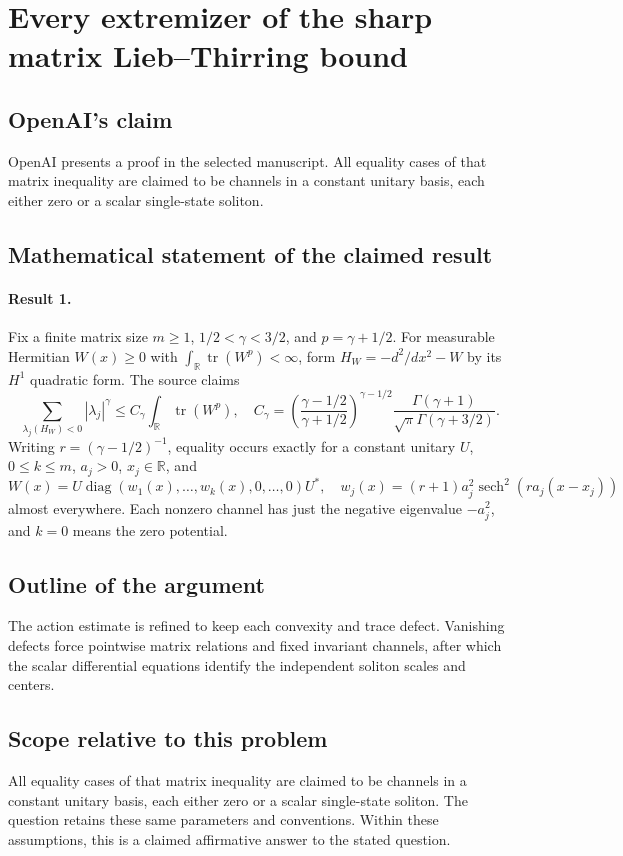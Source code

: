 \documentclass[11pt]{article}
\begin{document}
\section*{Every extremizer of the sharp matrix Lieb–Thirring bound}

\subsection{OpenAI's claim}
OpenAI presents a proof in the selected manuscript. All equality cases of that matrix inequality are claimed to be channels in a constant unitary basis, each either zero or a scalar single-state soliton.

\subsection{Mathematical statement of the claimed result}
\paragraph{Result 1.} Fix a finite matrix size \(m\ge1\), \(1/2<\gamma<3/2\), and \(p=\gamma+1/2\). For measurable Hermitian \(W(x)\ge0\) with \(\int_{\mathbb R}\operatorname{tr}(W^p)<\infty\), form \(H_W=-d^2/dx^2-W\) by its \(H^1\) quadratic form. The source claims
\[
 \sum_{\lambda_j(H_W)<0}|\lambda_j|^\gamma
 \le C_\gamma\int_{\mathbb R}\operatorname{tr}(W^p),\quad
 C_\gamma=\left(\frac{\gamma-1/2}{\gamma+1/2}\right)^{\gamma-1/2}
 \frac{\Gamma(\gamma+1)}{\sqrt\pi\Gamma(\gamma+3/2)}.
\]
Writing \(r=(\gamma-1/2)^{-1}\), equality occurs exactly for a constant unitary \(U\), \(0\le k\le m\), \(a_j>0\), \(x_j\in\mathbb R\), and
\[
 W(x)=U\operatorname{diag}(w_1(x),\ldots,w_k(x),0,\ldots,0)U^*,\quad
 w_j(x)=(r+1)a_j^2\operatorname{sech}^2(ra_j(x-x_j))
\]
almost everywhere. Each nonzero channel has just the negative eigenvalue \(-a_j^2\), and \(k=0\) means the zero potential.

\subsection{Outline of the argument}
The action estimate is refined to keep each convexity and trace defect. Vanishing defects force pointwise matrix relations and fixed invariant channels, after which the scalar differential equations identify the independent soliton scales and centers.

\subsection{Scope relative to this problem}
All equality cases of that matrix inequality are claimed to be channels in a constant unitary basis, each either zero or a scalar single-state soliton. The question retains these same parameters and conventions. Within these assumptions, this is a claimed affirmative answer to the stated question.
\end{document}

